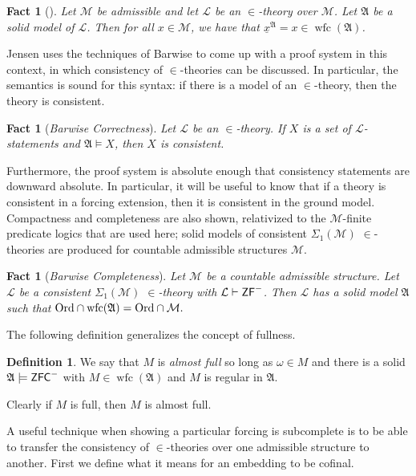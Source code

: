 \documentclass{amsart}
\newtheorem{fact}[theorem]{Fact}
\theoremstyle{definition}
\newtheorem{definition}[theorem]{Definition}
\theoremstyle{remark}
\newcommand{\M}{\mathcal{M}}
\newcommand{\ZFC}{\textup{\ensuremath{\textsf{ZFC}}}}
\newcommand{\Ord}{\textup{\ensuremath{\text{Ord}}}}
\DeclareMathOperator{\wfc}{wfc}
\begin{document}
\begin{fact}[{\cite[Ch.~2, Lemma 9]{Jensen:2014}}] \label{fact:PointofBasicAxioms} Let $\M$ be admissible and let $\mathcal L$ be an $\in$-theory over $\M$. Let $\mathfrak A$ be a solid model of $\mathcal L$. Then for all $x \in \M$, we have that $\underline{x}^{\mathfrak A} = x \in \wfc(\mathfrak A)$. \end{fact}

Jensen uses the techniques of Barwise to come up with a proof system in this context, in which consistency of $\in$-theories can be discussed. In particular, the semantics is sound for this syntax: if there is a model of an \(\in\)-theory, then the theory is consistent. 
\begin{fact}[\emph{Barwise Correctness}] \label{fact:correctness} 
Let $\mathcal L$ be an $\in$-theory. If $X$ is a set of $\mathcal L$-statements and $\mathfrak A \models X$, then $X$ is consistent. \end{fact}

Furthermore, the proof system is absolute enough that consistency statements are downward absolute. In particular, it will be useful to know that if a theory is consistent in a forcing extension, then it is consistent in the ground model. Compactness and completeness are also shown, relativized to the $\M$-finite predicate logics that are used here; solid models of consistent $\Sigma_1(\M)$ $\in$-theories are produced for countable admissible structures $\M$. 

\begin{fact}[\emph{Barwise Completeness}] \label{fact:completeness} Let $\M$ be a countable admissible structure. Let $\mathcal L$ be a consistent $\Sigma_1(\M)$ $\in$-theory with $\mathcal L \vdash \textsf{\textup{ZF}}^-$. Then $\mathcal L$ has a solid model $\mathfrak A$ such that $\Ord \cap \wfc(\mathfrak A) = \Ord \cap \M.$ \end{fact}

The following definition generalizes the concept of fullness.
\begin{definition} We say that $M$ is \emph{almost full} so long as $\omega \in M$ and there is a solid $\mathfrak A \models \ZFC^-$ with $M \in \wfc(\mathfrak A)$ and $M$ is regular in $\mathfrak A$. \end{definition}
Clearly if $M$ is full, then $M$ is almost full.

A useful technique when showing a particular forcing is subcomplete is to be able to transfer the consistency of $\in$-theories over one admissible structure to another. First we define what it means for an embedding to be cofinal.
\end{document}
